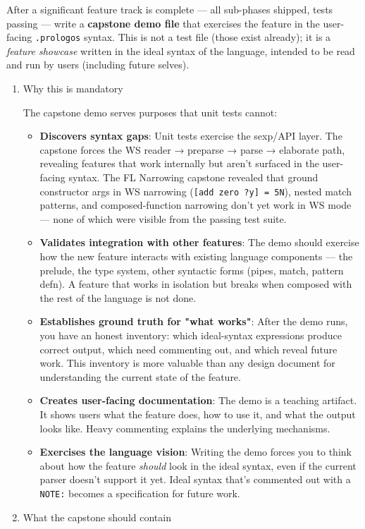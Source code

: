 \documentclass[11pt]{article}
\begin{document}
After a significant feature track is complete --- all sub-phases shipped,
tests passing --- write a \textbf{capstone demo file} that exercises the feature
in the user-facing \texttt{.prologos} syntax. This is not a test file (those
exist already); it is a \emph{feature showcase} written in the ideal syntax of
the language, intended to be read and run by users (including future selves).
\begin{enumerate}
\item Why this is mandatory
\label{sec:org758e5fb}

The capstone demo serves purposes that unit tests cannot:

\begin{itemize}
\item \textbf{Discovers syntax gaps}: Unit tests exercise the sexp/API layer. The
capstone forces the WS reader → preparse → parse → elaborate path,
revealing features that work internally but aren't surfaced in the
user-facing syntax. The FL Narrowing capstone revealed that ground
constructor args in WS narrowing (\texttt{[add zero ?y] = 5N}), nested match
patterns, and composed-function narrowing don't yet work in WS mode ---
none of which were visible from the passing test suite.

\item \textbf{Validates integration with other features}: The demo should exercise
how the new feature interacts with existing language components ---
the prelude, the type system, other syntactic forms (pipes, match,
pattern defn). A feature that works in isolation but breaks when
composed with the rest of the language is not done.

\item \textbf{Establishes ground truth for "what works"}: After the demo runs,
you have an honest inventory: which ideal-syntax expressions produce
correct output, which need commenting out, and which reveal future
work. This inventory is more valuable than any design document for
understanding the current state of the feature.

\item \textbf{Creates user-facing documentation}: The demo is a teaching artifact.
It shows users what the feature does, how to use it, and what the
output looks like. Heavy commenting explains the underlying mechanisms.

\item \textbf{Exercises the language vision}: Writing the demo forces you to think
about how the feature \emph{should} look in the ideal syntax, even if the
current parser doesn't support it yet. Ideal syntax that's commented
out with a \texttt{NOTE:} becomes a specification for future work.
\end{itemize}
\item What the capstone should contain
\label{sec:orgf30f295}


\end{enumerate}
\end{document}
